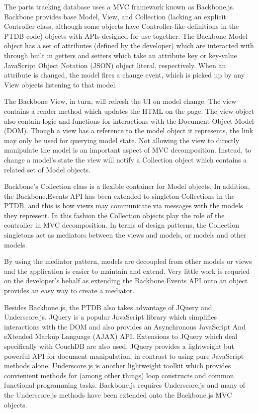 \documentclass[journal]{IEEEtran}
\begin{document}
The parts tracking database uses a MVC framework known as Backbone.js. Backbone provides
base Model, View, and Collection (lacking an explicit Controller class, although some objects have
Controller-like definitions in the PTDB code) objects with APIs designed for use together. 
The Backbone Model 
object has a set of attributes (defined by the developer) which are interacted with through
built in getters and setters which take an attribute key or key-value JavaScript Object Notation (JSON) object literal,
respectively. When an attribute is changed, the model fires a change event, which is picked
up by any View objects listening to that model.

The Backbone View, in turn, will refresh the UI on model change. The view contains a render
method which updates the HTML on the page. The view object also contain logic and functions
for interactions with the Document Object Model (DOM). Though a view has a reference to the model object it represents,
the link may only be used for querying model state. Not allowing the view to directly manipulate
the model is an important aspect of MVC decomposition. Instead, to change a model's state the
view will notify a Collection object which contains a related set of Model objects.

Backbone's Collection class is a flexible container for Model objects.
In addition, the Backbone.Events API has been extended
to singleton Collections in the PTDB, and this is how views may communicate via messages
with the models they represent. In this fashion the Collection objects play the role of
the controller in MVC decomposition. In terms of design patterns, the Collection singletons 
act as mediators between the views and models, or models and other models.

By using the mediator pattern, models are decoupled from other models or views and the
application is easier to maintain and extend. Very little work is requried on the 
developer's behalf as extending the Backbone.Events API onto an object provides an
easy way to create a mediator.

Besides Backbone.js, the PTDB also takes advantage of JQuery and Underscore.js.
JQuery is a popular JavaScript library which simplifies interactions with the DOM and also provides
an Asynchronous JavaScript And eXtended Markup Language (AJAX) API. Extensions to JQuery which deal specifically with CouchDB are also used.
JQuery provides a lightweight but powerful API for document manipulation, in contrast to
using pure JavaScript methods alone. Underscore.js is another lightweight toolkit which provides
convienient methods for (among other things) loop constructs and common functional programming tasks.
Backbone.js requires Underscore.js and many of the Underscore.js methods have been extended onto the 
Backbone.js MVC objects.
\end{document}
